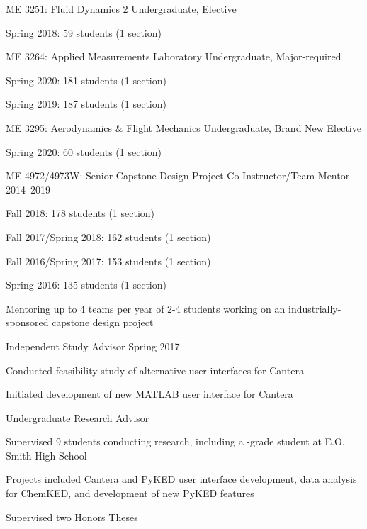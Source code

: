 \begin{outerlist}
\item ME 3251: Fluid Dynamics 2 \hfill Undergraduate, Elective
\begin{innerlist}
    \item Spring 2018: 59 students (1 section)
\end{innerlist}

\item ME 3264: Applied Measurements Laboratory \hfill Undergraduate, Major-required
\begin{innerlist}
    \item Spring 2020: 181 students (1 section)
    \item Spring 2019: 187 students (1 section)
\end{innerlist}

\item ME 3295: Aerodynamics \& Flight Mechanics \hfill Undergraduate, Brand New Elective
\begin{innerlist}
    \item Spring 2020: 60 students (1 section)
\end{innerlist}

\item ME 4972/4973W: Senior Capstone Design Project Co-Instructor/Team Mentor \hfill 2014--2019
\begin{innerlist}
    \item Fall 2018: 178 students (1 section)
    \item Fall 2017/Spring 2018: 162 students (1 section)
    \item Fall 2016/Spring 2017: 153 students (1 section)
    \item Spring 2016: 135 students (1 section)
    \item Mentoring up to 4 teams per year of 2-4 students working on an
    industrially-sponsored capstone design project
\end{innerlist}

\item Independent Study Advisor \hfill Spring 2017
\begin{innerlist}
    \item Conducted feasibility study of alternative user interfaces for Cantera
    \item Initiated development of new \textsc{MATLAB} user interface for Cantera
\end{innerlist}

\item Undergraduate Research Advisor
\begin{innerlist}
    \item Supervised 9 students conducting research, including a -grade student at E.O. Smith High School
    \item Projects included Cantera and PyKED user interface development, data analysis for ChemKED, and development of new PyKED features
    \item Supervised two Honors Theses
\end{innerlist}

\end{outerlist}

